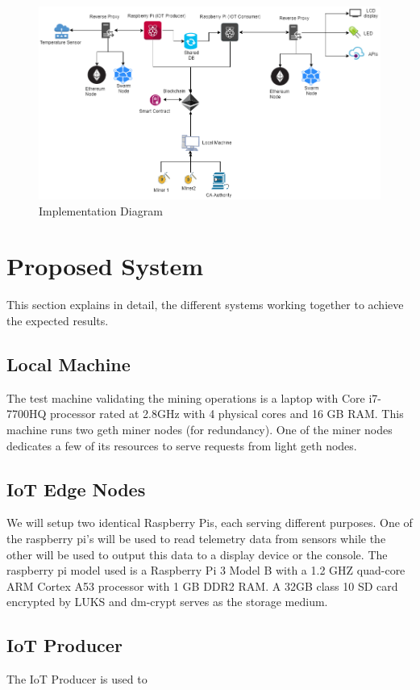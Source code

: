 \documentclass[11pt,openright]{report}
\begin{document}
\begin{figure}
	\centering
	\includegraphics[scale=0.5]{images/Final_Implementation.png}
	\caption{Implementation Diagram}
	\label{fig:impldiagram_architechture}
\end{figure}


\section{Proposed System}
This section explains in detail, the different systems working together to achieve the expected results.

\subsection{Local Machine}
The test machine validating the mining operations is a laptop with Core i7-7700HQ processor rated at 2.8GHz with 4 physical cores and 16 GB RAM. This machine runs two geth miner nodes (for redundancy). One of the miner nodes dedicates a few of its resources to serve requests from light geth nodes.

\subsection{IoT Edge Nodes}
We will setup two identical Raspberry Pis, each serving different purposes. One of the raspberry pi's will be used to read telemetry data from sensors while the other will be used to output this data to a display device or the console.
The raspberry pi model used is a Raspberry Pi 3 Model B with a 1.2 GHZ quad-core ARM Cortex A53 processor with 1 GB DDR2 RAM. A 32GB class 10 SD card encrypted by LUKS and dm-crypt serves as the storage medium.

\subsection{IoT Producer}
The IoT Producer is used to 
\end{document}
